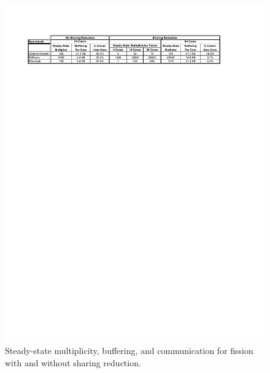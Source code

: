 \begin{figure}[t]
\centering
\includegraphics[width=6.1in]{figures/big-table.pdf}
\caption{\label{fig:big-table}  Steady-state multiplicity, buffering,
  and communication for fission with and without sharing reduction.}
\end{figure}



